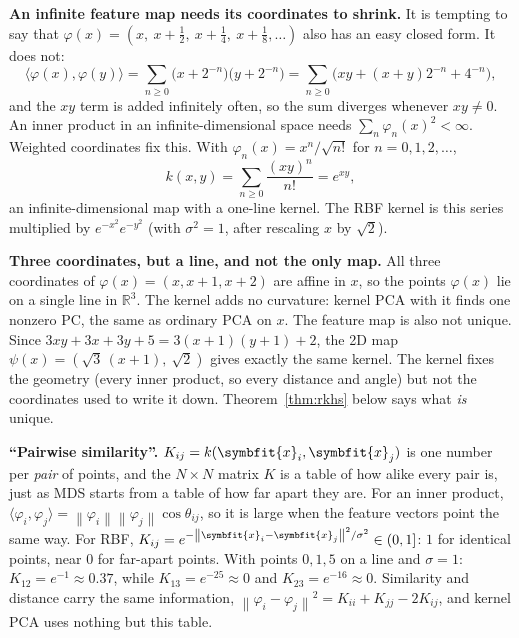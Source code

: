 \documentclass[11pt]{article}
\newcommand{\bm}[1]{\symbfit{#1}}
\newcommand{\R}{\mathbb{R}}
\newcommand{\vx}{\bm{x}}
\newcommand{\norm}[1]{\left\lVert #1\right\rVert}
\begin{document}
\begin{careful}
\textbf{An infinite feature map needs its coordinates to shrink.} It is tempting to say that
$\varphi(x)=(x,\ x+\tfrac12,\ x+\tfrac14,\ x+\tfrac18,\dots)$ also has an easy closed form. It does not:
\[
\langle\varphi(x),\varphi(y)\rangle=\sum_{n\ge0}\big(x+2^{-n}\big)\big(y+2^{-n}\big)
=\sum_{n\ge0}\Big(xy+(x+y)2^{-n}+4^{-n}\Big),
\]
and the $xy$ term is added infinitely often, so the sum diverges whenever $xy\ne0$. An inner product in an infinite-dimensional
space needs $\sum_n\varphi_n(x)^2<\infty$. Weighted coordinates fix this. With $\varphi_n(x)=x^n/\sqrt{n!}$ for $n=0,1,2,\dots$,
\[
k(x,y)=\sum_{n\ge0}\frac{(xy)^n}{n!}=e^{xy},
\]
an infinite-dimensional map with a one-line kernel. The RBF kernel is this series multiplied by $e^{-x^2}e^{-y^2}$ (with $\sigma^2=1$, after rescaling $x$ by $\sqrt2$).
\end{careful}

\begin{intuition}
\textbf{Three coordinates, but a line, and not the only map.} All three coordinates of $\varphi(x)=(x,x+1,x+2)$ are
affine in $x$, so the points $\varphi(x)$ lie on a single line in $\R^3$. The kernel adds no curvature: kernel PCA with
it finds one nonzero PC, the same as ordinary PCA on $x$. The feature map is also not unique. Since
$3xy+3x+3y+5=3(x+1)(y+1)+2$, the 2D map $\psi(x)=(\sqrt3\,(x+1),\ \sqrt2)$ gives exactly the same kernel. The kernel fixes the
geometry (every inner product, so every distance and angle) but not the coordinates used to write it down. Theorem~\ref{thm:rkhs} below
says what \emph{is} unique.
\end{intuition}

\begin{intuition}
\textbf{``Pairwise similarity''.} $K_{ij}=k(\vx_i,\vx_j)$ is one number per \emph{pair} of points, and the $N\times N$ matrix $K$ is a
table of how alike every pair is, just as MDS starts from a table of how far apart they are. For an inner product,
$\langle\varphi_i,\varphi_j\rangle=\norm{\varphi_i}\norm{\varphi_j}\cos\theta_{ij}$, so it is large when the feature vectors point the same way. For RBF,
$K_{ij}=e^{-\norm{\vx_i-\vx_j}^2/\sigma^2}\in(0,1]$: $1$ for identical points, near $0$ for far-apart points. With points $0,1,5$ on a line and
$\sigma=1$: $K_{12}=e^{-1}\approx0.37$, while $K_{13}=e^{-25}\approx0$ and $K_{23}=e^{-16}\approx0$. Similarity and distance carry the same information,
$\norm{\varphi_i-\varphi_j}^2=K_{ii}+K_{jj}-2K_{ij}$, and kernel PCA uses nothing but this table.
\end{intuition}
\end{document}
